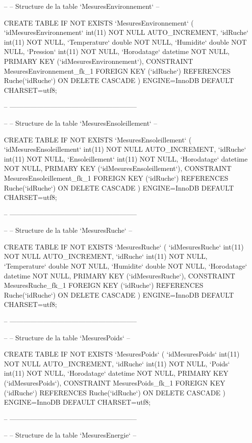 \begin{DoxyCode}
--
-- Structure de la table `MesuresEnvironnement`
--

CREATE TABLE IF NOT EXISTS `MesuresEnvironnement` (
  `idMesuresEnvironnement` int(11) NOT NULL AUTO\_INCREMENT,
  `idRuche` int(11) NOT NULL,
  `Temperature` double NOT NULL,
  `Humidite` double NOT NULL,
  `Pression` int(11) NOT NULL,
  `Horodatage` datetime NOT NULL,
  PRIMARY KEY (`idMesuresEnvironnement`),
  CONSTRAINT MesuresEnvironnement\_fk\_1 FOREIGN KEY (`idRuche`) REFERENCES Ruche(`idRuche`) ON DELETE
       CASCADE
) ENGINE=InnoDB DEFAULT CHARSET=utf8;

-- --------------------------------------------------------

--
-- Structure de la table `MesuresEnsoleillement`
--

CREATE TABLE IF NOT EXISTS `MesuresEnsoleillement` (
  `idMesuresEnsoleillement` int(11) NOT NULL AUTO\_INCREMENT,
  `idRuche` int(11) NOT NULL,
  `Ensoleillement` int(11) NOT NULL,
  `Horodatage` datetime NOT NULL,
  PRIMARY KEY (`idMesuresEnsoleillement`),
  CONSTRAINT MesuresEnsoleillement\_fk\_1 FOREIGN KEY (`idRuche`) REFERENCES Ruche(`idRuche`) ON DELETE
       CASCADE
) ENGINE=InnoDB DEFAULT CHARSET=utf8;

-- --------------------------------------------------------

--
-- Structure de la table `MesuresRuche`
--

CREATE TABLE IF NOT EXISTS `MesuresRuche` (
  `idMesuresRuche` int(11) NOT NULL AUTO\_INCREMENT, 
  `idRuche` int(11) NOT NULL,
  `Temperature` double NOT NULL,
  `Humidite` double NOT NULL,
  `Horodatage` datetime NOT NULL,
  PRIMARY KEY (`idMesuresRuche`),
  CONSTRAINT MesuresRuche\_fk\_1 FOREIGN KEY (`idRuche`) REFERENCES Ruche(`idRuche`) ON DELETE CASCADE
) ENGINE=InnoDB DEFAULT CHARSET=utf8;


-- --------------------------------------------------------

--
-- Structure de la table `MesuresPoids`
--

CREATE TABLE IF NOT EXISTS `MesuresPoids` (
  `idMesuresPoids` int(11) NOT NULL AUTO\_INCREMENT, 
  `idRuche` int(11) NOT NULL,
  `Poids` int(11) NOT NULL,
  `Horodatage` datetime NOT NULL,
  PRIMARY KEY (`idMesuresPoids`),
  CONSTRAINT MesuresPoids\_fk\_1 FOREIGN KEY (`idRuche`) REFERENCES Ruche(`idRuche`) ON DELETE CASCADE
) ENGINE=InnoDB DEFAULT CHARSET=utf8;

-- --------------------------------------------------------

--
-- Structure de la table `MesuresEnergie`
--


\end{DoxyCode}
